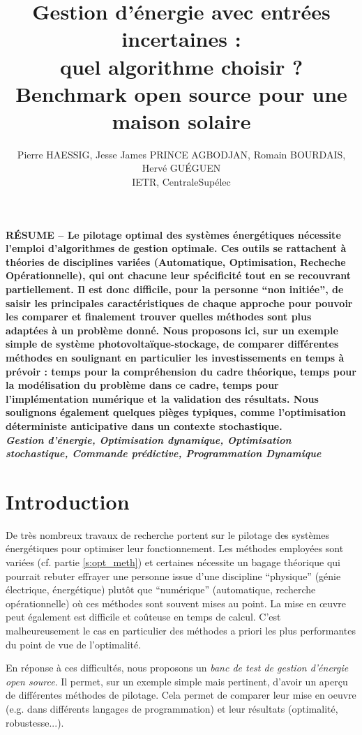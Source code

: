 \documentclass[a4paper,10pt,twocolumn]{article}
\title{
\fontsize{24pt}{24pt}\selectfont
Gestion d'énergie avec entrées incertaines : \\
quel algorithme choisir ?\\
Benchmark open source pour une maison solaire
}
\author{
\fontsize{11pt}{11pt}\selectfont
Pierre HAESSIG\tsp{*}, Jesse James PRINCE AGBODJAN\tsp{*}, Romain BOURDAIS\tsp{*}, Hervé GUÉGUEN\tsp{*}\\
\fontsize{10pt}{10pt}\selectfont
\tsp{*}IETR, CentraleSupélec
}
\date{}
\begin{document}
\maketitle
\thispagestyle{fancy}


\fontsize{9pt}{9pt}\selectfont
\textbf{RÉSUME --
Le pilotage optimal des systèmes énergétiques nécessite l'emploi d'algorithmes
de gestion optimale.
Ces outils se rattachent à théories de disciplines variées (Automatique, Optimisation, Recheche Opérationnelle),
qui ont chacune leur spécificité tout en se recouvrant partiellement.
%
Il est donc difficile, pour la personne ``non initiée'', de saisir les principales caractéristiques
de chaque approche pour pouvoir les comparer et finalement trouver
quelles méthodes sont plus adaptées à un problème donné.
%
Nous proposons ici, sur un exemple simple de système photovoltaïque-stockage, de
comparer différentes méthodes en soulignant en particulier les investissements
en temps à prévoir :
temps pour la compréhension du cadre théorique,
temps pour la modélisation du problème dans ce cadre,
temps pour l'implémentation numérique et la validation des résultats.
Nous soulignons également quelques pièges typiques, comme l'optimisation
déterministe anticipative dans un contexte stochastique.
}\\

\textbf{\textit{Gestion d'énergie, Optimisation dynamique, Optimisation stochastique,
Commande prédictive, Programmation Dynamique}}

\fontsize{10pt}{10pt}\selectfont


\section{Introduction}

De très nombreux travaux de recherche portent sur le pilotage des systèmes énergétiques
pour optimiser leur fonctionnement.
Les méthodes employées sont variées (cf. partie \ref{s:opt_meth})
et certaines nécessite un bagage théorique qui pourrait rebuter effrayer
une personne issue d'une discipline ``physique'' (génie électrique, énergétique)
plutôt que ``numérique'' (automatique, recherche opérationnelle) où ces méthodes
sont souvent mises au point.
La mise en œuvre peut également est difficile et coûteuse en temps de calcul.
C'est malheureusement le cas en particulier des méthodes
a priori les plus performantes du point de vue de l'optimalité.

En réponse à ces difficultés, nous proposons un \emph{banc de test de gestion d'énergie open source}.
Il permet, sur un exemple simple mais pertinent, d'avoir un aperçu de différentes méthodes
de pilotage. Cela permet de comparer leur mise en oeuvre (e.g. dans différents langages de programmation)
et leur résultats (optimalité, robustesse...).
\end{document}
